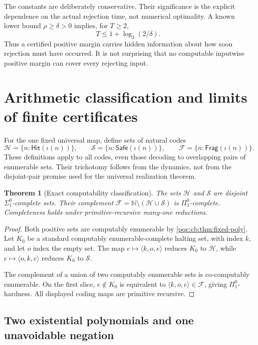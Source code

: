 \documentclass[11pt,letterpaper]{article}
\numberwithin{equation}{section}
\newtheorem{theorem}{Theorem}[section]
\theoremstyle{definition}
\theoremstyle{remark}
\newcommand{\N}{\mathbb N}
\newcommand{\Hit}{\mathsf{Hit}}
\newcommand{\Safe}{\mathsf{Safe}}
\newcommand{\Frag}{\mathsf{Frag}}
\newcommand{\cenum}{computably enumerable}
\begin{document}
The constants are deliberately conservative.  Their significance is the
explicit dependence on the actual rejection time, not numerical optimality.
A known lower bound $\rho\ge\delta>0$ implies, for $T\ge2$,
\begin{equation}
 T\le1+\log_3(2/\delta).
 \label{pqc:cb:eq:time-from-radius}
\end{equation}
Thus a certified positive margin carries hidden information about how soon
rejection must have occurred.  It is not surprising that no computable inputwise
positive margin can cover every rejecting input.

\section{Arithmetic classification and limits of finite certificates}
\label{pqc:cb:sec:classification}

For the one fixed universal map, define sets of natural codes
\[
 \mathcal H=\{n:\Hit(\iota(n))\},\qquad
 \mathcal S=\{n:\Safe(\iota(n))\},\qquad
 \mathcal F=\{n:\Frag(\iota(n))\}.
\]
These definitions apply to all codes, even those decoding to overlapping
pairs of enumerable sets.  Their trichotomy follows from the dynamics, not
from the disjoint-pair promise used for the universal realization theorem.

\begin{theorem}[Exact computability classification]
\label{pqc:cb:thm:classification}
The sets $\mathcal H$ and $\mathcal S$ are disjoint $\Sigma^0_1$-complete sets.
Their complement $\mathcal F=\N\setminus(\mathcal H\cup\mathcal S)$ is
$\Pi^0_1$-complete.  Completeness holds under primitive-recursive many-one
reductions.
\end{theorem}
\begin{proof}
Both positive sets are \cenum{} by \cref{pqc:cb:thm:fixed-poly}.  Let $K_0$ be a standard
\cenum{}-complete halting set, with index $k$, and let $o$ index the empty set.
The map $e\mapsto\langle k,o,e\rangle$ reduces $K_0$ to $\mathcal H$, while
$e\mapsto\langle o,k,e\rangle$ reduces $K_0$ to $\mathcal S$.

The complement of a union of two \cenum{} sets is co-computably enumerable.
On the first slice, $e\notin K_0$ is equivalent to
$\langle k,o,e\rangle\in\mathcal F$, giving $\Pi^0_1$-hardness.  All displayed
coding maps are primitive recursive.
\end{proof}

\subsection{Two existential polynomials and one unavoidable negation}
\end{document}
